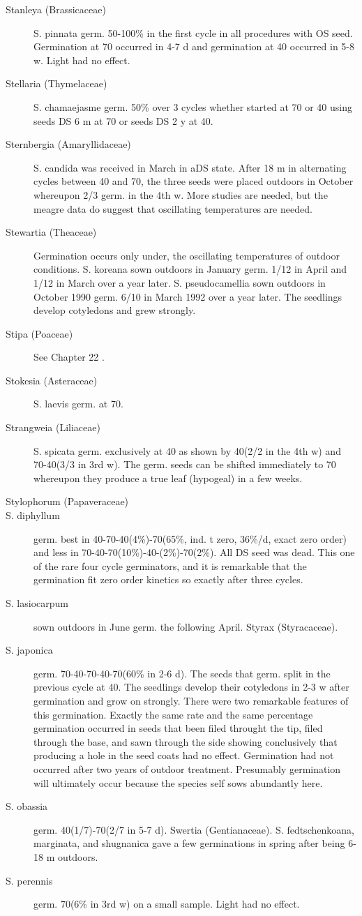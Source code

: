 \begin{description}
\item[Stanleya (Brassicaceae)] S. pinnata germ. 50-100\% in the first cycle in all
procedures with OS seed. Germination at 70 occurred in 4-7 d and germination at 40
occurred in 5-8 w. Light had no effect.
\item[Stellaria (Thymelaceae)] S. chamaejasme germ. 50\% over 3 cycles
whether started at 70 or 40 using seeds DS 6 m at 70 or seeds DS 2 y at 40.
\item[Sternbergia (Amaryllidaceae)] S. candida was received in March in aDS
state. After 18 m in alternating cycles between 40 and 70, the three seeds were
placed outdoors in October whereupon 2/3 germ. in the 4th w. More studies are
needed, but the meagre data do suggest that oscillating temperatures are needed.
\item[Stewartia (Theaceae)] Germination occurs only under, the oscillating
temperatures of outdoor conditions. S. koreana sown outdoors in January germ. 1/12
in April and 1/12 in March over a year later. S. pseudocamellia sown outdoors in
October 1990 germ. 6/10 in March 1992 over a year later. The seedlings develop
cotyledons and grew strongly.
\item[Stipa (Poaceae)] See Chapter 22 .
\item[Stokesia (Asteraceae)] S. laevis germ. at 70.

\item[Strangweia (Liliaceae)] S. spicata germ. exclusively at 40 as shown by
40(2/2 in the 4th w) and 70-40(3/3 in 3rd w). The germ. seeds can be shifted
immediately to 70 whereupon they produce a true leaf (hypogeal) in a few weeks.

\item[Stylophorum (Papaveraceae)]
\item[S. diphyllum] germ. best in 40-70-40(4\%)-70(65\%, ind. t zero, 36\%/d, exact zero
order) and less in 70-40-70(10\%)-40-(2\%)-70(2\%). All DS seed was dead. This one
of the rare four cycle germinators, and it is remarkable that the germination fit zero
order kinetics so exactly after three cycles.
\item[S. lasiocarpum] sown outdoors in June germ. the following April.
Styrax (Styracaceae).
\item[S. japonica] germ. 70-40-70-40-70(60\% in 2-6 d). The seeds that germ. split in
the previous cycle at 40. The seedlings develop their cotyledons in 2-3 w after
germination and grow on strongly. There were two remarkable features of this
germination. Exactly the same rate and the same percentage germination occurred in
seeds that been filed throught the tip, filed through the base, and sawn through the
side showing conclusively that producing a hole in the seed coats had no effect.
Germination had not occurred after two years of outdoor treatment. Presumably
germination will ultimately occur because the species self sows abundantly here.
\item[S. obassia] germ. 40(1/7)-70(2/7 in 5-7 d).
Swertia (Gentianaceae). S. fedtschenkoana, marginata, and shugnanica
gave a few germinations in spring after being 6-18 m outdoors.
\item[S. perennis] germ. 70(6\% in 3rd w) on a small sample. Light had no effect.


\end{description}

